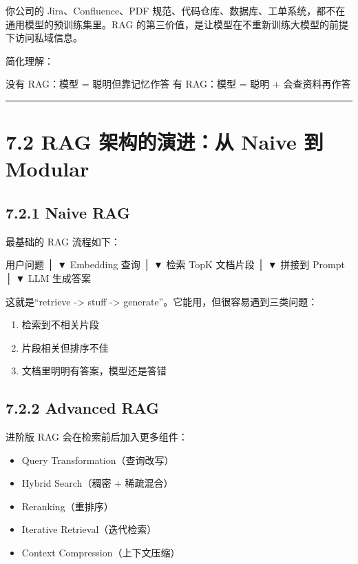 你公司的 Jira、Confluence、PDF 规范、代码仓库、数据库、工单系统，都不在通用模型的预训练集里。RAG 的第三价值，是让模型在不重新训练大模型的前提下访问私域信息。


简化理解：


\begin{codeblock}
没有 RAG：模型 = 聪明但靠记忆作答
有 RAG：模型 = 聪明 + 会查资料再作答
\end{codeblock}

\bigskip\hrule\bigskip

\section{7.2 RAG 架构的演进：从 Naive 到 Modular}

\subsection{7.2.1 Naive RAG}

最基础的 RAG 流程如下：


\begin{codeblock}
用户问题
   │
   ▼
Embedding 查询
   │
   ▼
检索 TopK 文档片段
   │
   ▼
拼接到 Prompt
   │
   ▼
LLM 生成答案
\end{codeblock}

这就是``retrieve -> stuff -> generate''。它能用，但很容易遇到三类问题：


\begin{enumerate}[leftmargin=2em]
\item 检索到不相关片段
\item 片段相关但排序不佳
\item 文档里明明有答案，模型还是答错
\end{enumerate}

\subsection{7.2.2 Advanced RAG}

进阶版 RAG 会在检索前后加入更多组件：


\begin{itemize}[leftmargin=2em]
\item Query Transformation（查询改写）
\item Hybrid Search（稠密 + 稀疏混合）
\item Reranking（重排序）
\item Iterative Retrieval（迭代检索）
\item Context Compression（上下文压缩）
\end{itemize}


